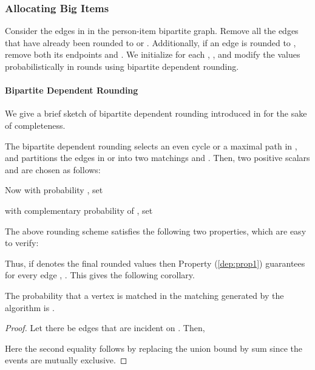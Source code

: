 \subsubsection{Allocating Big Items}
\label{subsec:match}
Consider the edges in  in the person-item bipartite graph. Remove all the edges  that have already been rounded to  or . Additionally, if an edge is rounded to , remove both its endpoints  and .  We initialize for each , , and modify the  values probabilistically in rounds using bipartite dependent rounding.


\paragraph{{\bf Bipartite Dependent Rounding}\cite{gkps:dep-round}}
\label{subsec:bipartite}
 We give a brief sketch of bipartite dependent rounding introduced in \cite{gkps:dep-round} for the sake of completeness.

  The bipartite dependent rounding selects an even cycle  or a maximal path  in , and partitions the edges in  or  into two matchings  and . Then, two positive scalars  and  are chosen as follows:
 
 

Now with probability , set

with complementary probability of , set


The above rounding scheme satisfies the following two properties, which are easy to verify:




Thus, if  denotes the final rounded values then Property (\ref{dep:prop1}) guarantees for every edge ,  . This gives the following corollary.



\begin{corollary}
\label{cor:match1}
The probability that a vertex  is matched in the matching generated by the algorithm is .
\end{corollary}

\begin{proof}
Let there be  edges  that are incident on . Then,


Here the second equality follows by replacing the union bound by sum since the events are mutually exclusive.
\end{proof}

